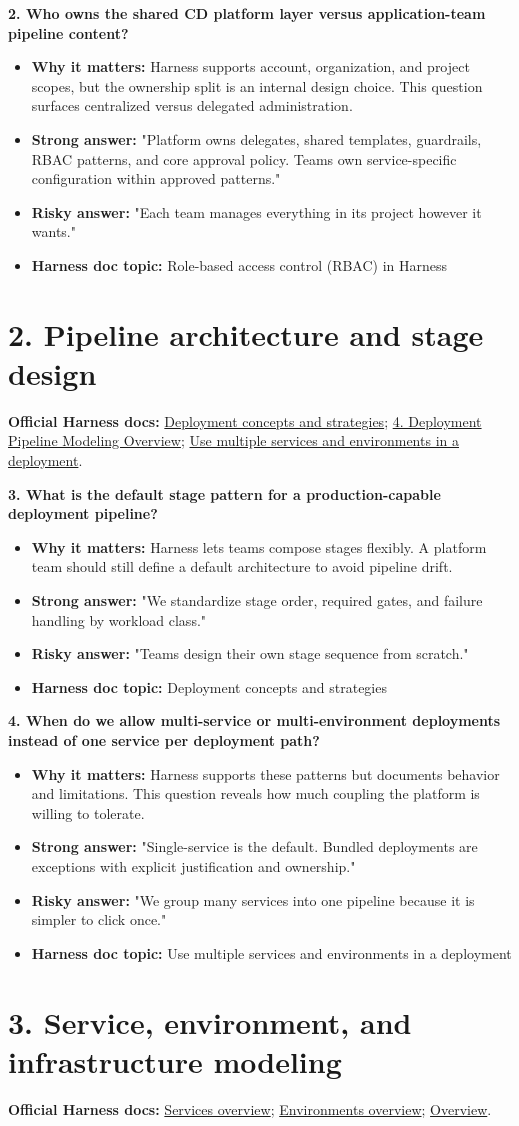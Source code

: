 \documentclass[11pt]{article}
\newcommand{\doccluster}[1]{%
  {\small\textcolor{AccentGray}{\textbf{Official Harness docs:} #1}}\par\vspace{0.4em}
}
\newcommand{\qblock}[5]{%
  \textbf{#1}\par
  \begin{itemize}[leftmargin=1.5em,itemsep=0.2em,topsep=0.3em]
    \item[--] \textbf{Why it matters:} #2
    \item[--] \textbf{Strong answer:} #3
    \item[--] \textbf{Risky answer:} #4
    \item[--] \textbf{Harness doc topic:} #5
  \end{itemize}
  \vspace{0.4em}
}
\begin{document}
\qblock{2. Who owns the shared CD platform layer versus application-team pipeline content?}{Harness supports account, organization, and project scopes, but the ownership split is an internal design choice. This question surfaces centralized versus delegated administration.}{"Platform owns delegates, shared templates, guardrails, RBAC patterns, and core approval policy. Teams own service-specific configuration within approved patterns."}{"Each team manages everything in its project however it wants."}{Role-based access control (RBAC) in Harness}

\section*{2. Pipeline architecture and stage design}
\doccluster{\href{https://developer.harness.io/docs/continuous-delivery/manage-deployments/deployment-concepts}{Deployment concepts and strategies}; \href{https://developer.harness.io/docs/continuous-delivery/cd-onboarding/new-user/cd-pipeline-modeling-overview}{4. Deployment Pipeline Modeling Overview}; \href{https://developer.harness.io/docs/continuous-delivery/x-platform-cd-features/advanced/multiserv-multienv/}{Use multiple services and environments in a deployment}.}

\qblock{3. What is the default stage pattern for a production-capable deployment pipeline?}{Harness lets teams compose stages flexibly. A platform team should still define a default architecture to avoid pipeline drift.}{"We standardize stage order, required gates, and failure handling by workload class."}{"Teams design their own stage sequence from scratch."}{Deployment concepts and strategies}

\qblock{4. When do we allow multi-service or multi-environment deployments instead of one service per deployment path?}{Harness supports these patterns but documents behavior and limitations. This question reveals how much coupling the platform is willing to tolerate.}{"Single-service is the default. Bundled deployments are exceptions with explicit justification and ownership."}{"We group many services into one pipeline because it is simpler to click once."}{Use multiple services and environments in a deployment}

\section*{3. Service, environment, and infrastructure modeling}
\doccluster{\href{https://developer.harness.io/docs/continuous-delivery/x-platform-cd-features/services/services-overview}{Services overview}; \href{https://developer.harness.io/docs/continuous-delivery/x-platform-cd-features/environments/environment-overview}{Environments overview}; \href{https://developer.harness.io/docs/continuous-delivery/overview}{Overview}.}
\end{document}
